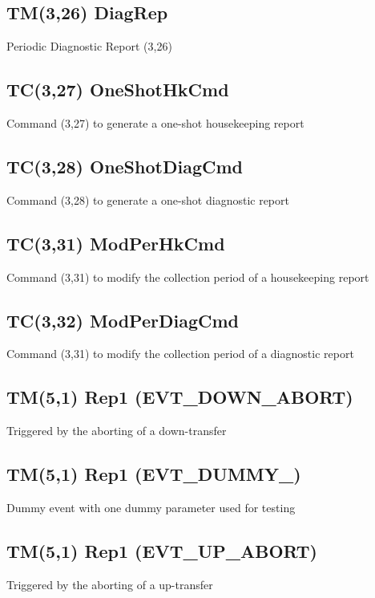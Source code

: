 \pagebreak
\subsection{TM(3,26) DiagRep}
Periodic Diagnostic Report (3,26)

\pagebreak
\subsection{TC(3,27) OneShotHkCmd}
Command (3,27) to generate a one-shot housekeeping report

\pagebreak
\subsection{TC(3,28) OneShotDiagCmd}
Command (3,28) to generate a one-shot diagnostic report

\pagebreak
\subsection{TC(3,31) ModPerHkCmd}
Command (3,31) to modify the collection period of a housekeeping report

\pagebreak
\subsection{TC(3,32) ModPerDiagCmd}
Command (3,31) to modify the collection period of a diagnostic report

\pagebreak
\subsection{TM(5,1) Rep1 (EVT\_\-DOWN\_\-ABORT)}
Triggered by the aborting of a down-transfer

\pagebreak
\subsection{TM(5,1) Rep1 (EVT\_\-DUMMY\_)}
Dummy event with one dummy parameter used for testing

\pagebreak
\subsection{TM(5,1) Rep1 (EVT\_\-UP\_\-ABORT)}
Triggered by the aborting of a up-transfer

